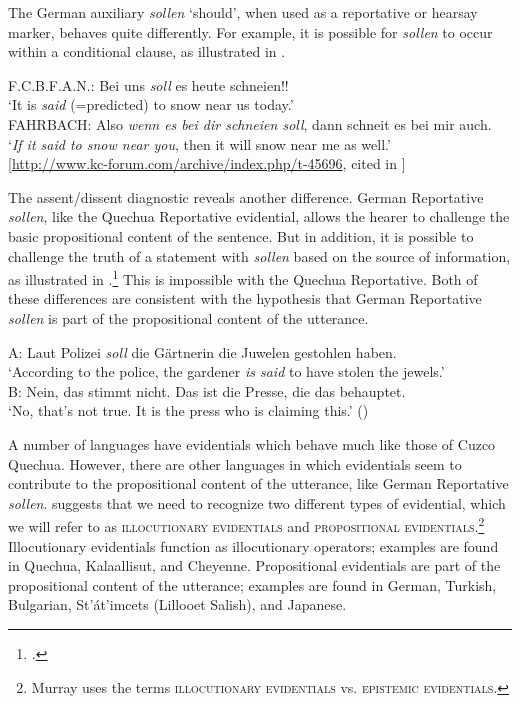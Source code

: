 The German auxiliary \textit{sollen} ‘should’, when used as a reportative or hearsay marker, behaves quite differently. For example, it is possible for \textit{sollen} to occur within a conditional clause, as illustrated in .


\ea
F.C.B.F.A.N.: Bei uns \textit{soll} es heute schneien!!\\
‘It is \textit{said} (=predicted) to snow near us today.’\\
FAHRBACH: Also \textit{wenn es bei dir schneien soll}, dann schneit es bei mir auch.\\
‘\textit{If it said to snow near you}, then it will snow near me as well.’\\
   {}[\url{http://www.kc-forum.com/archive/index.php/t-45696}, cited in \citealt{Faller2006}]
\z


The assent/dissent diagnostic reveals another difference. German Reportative \textit{sollen}, like the Quechua Reportative evidential, allows the hearer to challenge the basic propositional content of the sentence. But in addition, it is possible to challenge the truth of a statement with \textit{sollen} based on the source of information, as illustrated in .\footnote{\citet{Faller2006}.} This is impossible with the Quechua Reportative. Both of these differences are consistent with the hypothesis that German Reportative \textit{sollen} is part of the propositional content of the utterance.


\ea
A: Laut Polizei \textit{soll} die Gärtnerin die Juwelen gestohlen haben.\\
   ‘According to the police, the gardener \textit{is said} to have stolen the jewels.’\\
B: Nein, das stimmt nicht. Das ist die Presse, die das behauptet.\\
   ‘No, that’s not true. It is the press who is claiming this.’  (\citealt{Faller2006})
\z


A number of languages have evidentials which behave much like those of Cuzco Quechua. However, there are other languages in which evidentials seem to contribute to the propositional content of the utterance, like German Reportative \textit{sollen}. \citet{Murray2010} suggests that we need to recognize two different types of evidential, which we will refer to as \textsc{illocutionary evidentials} and \textsc{propositional evidentials}.\footnote{Murray uses the terms \textsc{illocutionary evidentials} vs. \textsc{epistemic evidentials}.} Illocutionary evidentials function as illocutionary operators; examples are found in Quechua, Kalaallisut, and Cheyenne. Propositional evidentials are part of the propositional content of the utterance; examples are found in German, Turkish, Bulgarian, St’át’imcets (Lillooet Salish), and Japanese.



